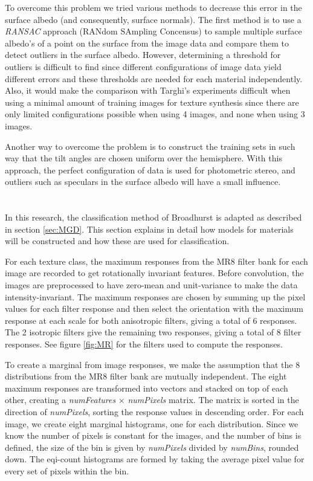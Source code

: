 To overcome this problem we tried various methods to decrease this error in the surface albedo (and consequently, surface normals). The first method is to use a {\it RANSAC} approach (RANdom SAmpling Concensus) to sample multiple surface albedo's of a point on the surface from the image data and compare them to detect outliers in the surface albedo. However, determining a threshold for outliers is difficult to find since different configurations of image data yield different errors and these thresholds are needed for each material independently. Also, it would make the comparison with Targhi's experiments difficult when using a minimal amount of training images for texture synthesis since there are only limited configurations possible when using 4 images, and none when using 3 images. 

Another way to overcome the problem is to construct the training sets in such way that the tilt angles are chosen uniform over the hemisphere. With this approach, the perfect configuration of data is used for photometric stereo, and outliers such as speculars in the surface albedo will have a small influence.

\section{}\label{sec:Classification}

In this research, the classification method of Broadhurst is adapted as described in section \ref{sec:MGD}. This section explains in detail how models for materials will be constructed and how these are used for classification.

For each texture class, the maximum responses from the MR8 filter bank for each image are recorded to get rotationally invariant features. Before convolution, the images are preprocessed to have zero-mean and unit-variance to make the data intensity-invariant. The maximum responses are chosen by summing up the pixel values for each filter response and then select the orientation with the maximum response at each scale for both anisotropic filters, giving a total of 6 responses. The 2 isotropic filters give the remaining two responses, giving a total of 8 filter responses. See figure \ref{fig:MR} for the filters used to compute the responses.

To create a marginal from image responses, we make the assumption that the 8 distributions from the MR8 filter bank are mutually independent. The eight maximum responses are transformed into vectors and stacked on top of each other, creating a {\it numFeatures} $\times$ {\it numPixels} matrix. The matrix is sorted in the direction of {\it numPixels}, sorting the response values in descending order. For each image, we create eight marginal histograms, one for each distribution. Since we know the number of pixels is constant for the images, and the number of bins is defined, the size of the bin is given by {\it numPixels} divided by {\it numBins}, rounded down. The eqi-count histograms are formed by taking the average pixel value for every set of pixels within the bin. 

